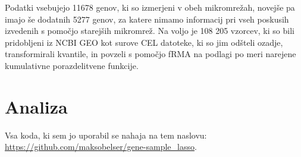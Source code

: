 \documentclass[onecolumn]{report}
\begin{document}
Podatki vsebujejo 11678 genov, ki so izmerjeni v obeh mikromrežah, novejše pa imajo še dodatnih 5277 genov, za katere nimamo informacij pri vseh poskusih izvedenih s pomočjo starejših mikromrež. Na voljo je 108 205 vzorcev, ki so bili pridobljeni iz NCBI GEO kot surove CEL datoteke, ki so jim odšteli ozadje, transformirali kvantile, in povzeli s pomočjo fRMA na podlagi po meri narejene kumulativne porazdelitvene funkcije.

\section*{Analiza}

Vsa koda, ki sem jo uporabil se nahaja na tem naslovu: \url{https://github.com/maksobelser/gene-sample_lasso}. 
\end{document}
